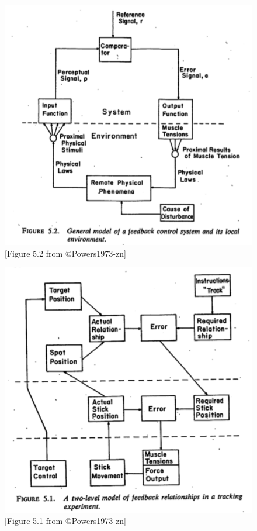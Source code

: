 \documentclass[
  letterpaper,
  DIV=11,
  numbers=noendperiod]{scrartcl}
\begin{document}
\begin{figure}[H]

{\centering \includegraphics{../include/img/powers-5.2.png}

}

\caption{{[}Figure 5.2 from @Powers1973-zn{]}}

\end{figure}%
\begin{figure}[H]

{\centering \includegraphics{./include/img/powers-5.1.png}

}

\caption{{[}Figure 5.1 from @Powers1973-zn{]}}

\end{figure}%
\end{document}
